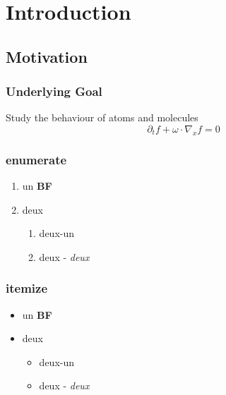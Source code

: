 \documentclass{beamer}
\begin{document}
\section{Introduction}

%	



\subsection{Motivation}

\begin{frame}
	\frametitle{Underlying Goal}
	
	\begin{center}
		 Study the behaviour of atoms and molecules
		 \[\partial_t f+\omega\cdot\nabla_x f =0\]
	\end{center}

\end{frame}

\begin{frame}
\frametitle{enumerate}
\begin{enumerate}
\item un \textbf{BF}
\item deux
\begin{enumerate}
\item deux-un
\item deux - \textit{deux}
\end{enumerate}
\end{enumerate}

\end{frame}

\begin{frame}
\frametitle{itemize}
\begin{itemize}
\item un \textbf{BF}
\item deux
\begin{itemize}
\item deux-un
\item deux - \textit{deux}
\end{itemize}
\end{itemize}

\end{frame}
\end{document}
